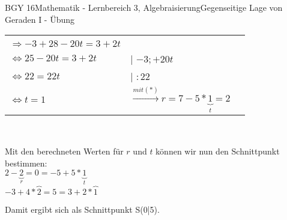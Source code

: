 \documentclass[oneside,openany,headings=optiontotoc,11pt,numbers=noenddot]{scrreprt}
\begin{document}
\begin{worksheet}{BGY 16}{Mathematik - Lernbereich 3, Algebraisierung}{Gegenseitige Lage von Geraden I - Übung}
\begin{framed}
\begin{tabular}{lll}
				\hline\\
				\(\Rightarrow -3+28-20t = 3+2t\)\\
				\(\Leftrightarrow 25-20t = 3+2t\) & | \(-3;+20t\)\\
				\(\Leftrightarrow 22 = 22t\) & | \(:22\)\\
				\(\Leftrightarrow t=1\) & \(\xrightarrow{mit (*)} r = 7 -5*\underbrace{1}_t = 2\)
			\end{tabular}\\
			\par\noindent
			Mit den berechneten Werten für \(r\) und \(t\) können wir nun den Schnittpunkt bestimmen:\\
			\(2-\underbrace{2}_{r} = 0 = -5+5*\underbrace{1}_{t}\)\\
			\(-3 +4*\overbrace{2} = 5 = 3+2*\overbrace{1}\)\\
			\par\noindent
			Damit ergibt sich als Schnittpunkt S(0|5).
		\end{framed}
	\end{worksheet}
\end{document}
